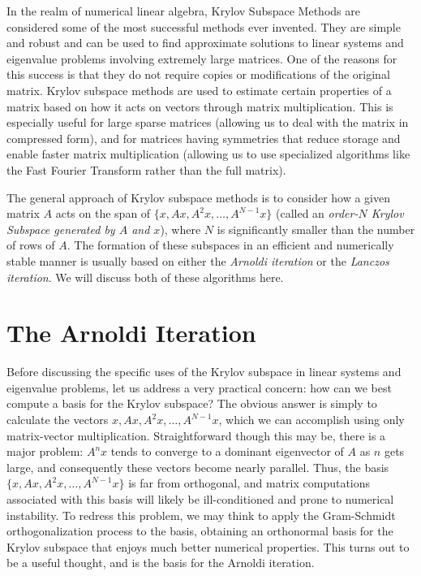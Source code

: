 \label{lab:kry_arnoldi}


In the realm of numerical linear algebra, Krylov Subspace Methods are considered some of the most successful  methods ever invented.
They are simple and robust and can be used to find approximate solutions to linear systems and eigenvalue problems involving extremely
large matrices.
One of the reasons for this success is that they do not require copies or modifications of the original
matrix.
Krylov subspace methods are used to estimate certain properties of a matrix based on how it acts on vectors through matrix multiplication.
This is especially useful for large sparse matrices (allowing us to deal with the matrix in compressed form),
and for matrices having symmetries that reduce storage and enable faster matrix multiplication (allowing us to use
specialized algorithms like the Fast Fourier Transform rather than the full matrix).

The general approach of Krylov subspace methods is to consider how a given matrix $A$ acts on the span of
$\{ x, Ax, A^2 x, \ldots, A^{N-1} x \}$ (called an \emph{order-$N$ Krylov Subspace generated by $A$ and $x$}), where $N$ is significantly
smaller than the number of rows of $A$.
The formation of these subspaces in an efficient and numerically stable manner is usually based on either the \emph{Arnoldi
iteration} or the \emph{Lanczos iteration}. We will discuss both of these algorithms here.

\section*{The Arnoldi Iteration}

Before discussing the specific uses of the Krylov subspace in linear systems and eigenvalue problems, let us address a very
practical concern: how can we best compute a basis for the Krylov subspace? The obvious answer is simply to 
calculate the vectors $x, Ax, A^2x, \ldots, A^{N-1} x$, which we can accomplish using only matrix-vector multiplication. 
Straightforward though this may be, there is a major problem: $A^n x$ tends to converge to a dominant eigenvector of $A$
as $n$ gets large, and consequently these vectors become nearly parallel. Thus, the basis $\{x, Ax, A^2x, \ldots, A^{N-1} x\}$
is far from orthogonal, and matrix computations associated with this basis will likely be ill-conditioned and prone to
numerical instability. To redress this problem, we may think to apply the Gram-Schmidt orthogonalization process to the
basis, obtaining an orthonormal basis for the Krylov subspace that enjoys much better numerical properties. This turns out to
be a useful thought, and is the basis for the Arnoldi iteration. 

